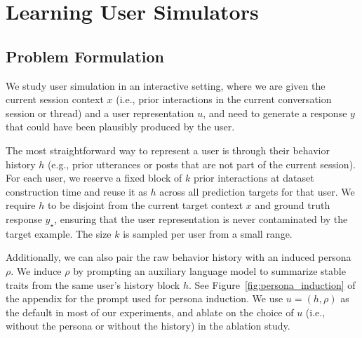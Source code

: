 \documentclass{article} %
\begin{document}


\section{Learning User Simulators}

\subsection{Problem Formulation}\label{sec:problem}


We study user simulation in an interactive setting, where we are given the current session context $x$ (i.e., prior interactions in the current conversation session or thread) and a user representation $u$, and need to generate a response $y$ that could have been plausibly produced by the user. 

The most straightforward way to represent a user is through their behavior history $h$ (e.g., prior utterances or posts that are not part of the current session). For each user, we reserve a fixed block of $k$ prior interactions at dataset construction time and reuse it as $h$ across all prediction targets for that user. We require $h$ to be disjoint from the current target context $x$ and ground truth response $y_\star$, ensuring that the user representation is never contaminated by the target example. The size $k$ is sampled per user from a small range.

Additionally, we can also pair the raw behavior history with an induced persona $\rho$. We induce $\rho$ by prompting an auxiliary language model to summarize stable traits from the same user's history block $h$. See  Figure~\ref{fig:persona_induction} of the appendix for the prompt used for persona induction. We use $u = (h, \rho)$ as the default in most of our experiments, and ablate on the choice of $u$ (i.e., without the persona or without the history) in the ablation study.
\end{document}
